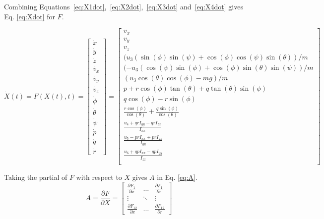 \documentclass[letterpaper, paper,11pt]{AAS}	%
\begin{document}
Combining Equations~\ref{eq:X1dot},~\ref{eq:X2dot},~\ref{eq:X3dot} and~\ref{eq:X4dot} gives Eq. \eqref{eq:Xdot} for $F$.


\begin{equation}
\label{eq:Xdot}
\dot{X}(t) = F(X(t), t) = \begin{bmatrix}
\dot{x} \\ \dot{y} \\ \dot{z} \\ \dot{v_x} \\ \dot{v_y} \\ \dot{v_z} \\ \dot{\phi} \\ \dot{\theta} \\ \dot{\psi} \\ \dot{p} \\ \dot{q} \\ \dot{r} 
\end{bmatrix} =  \begin{bmatrix}
v_x \\
v_y \\
v_z \\
(u_3(\sin(\phi)\sin(\psi) + \cos(\phi)\cos(\psi)\sin(\theta))/m \\
(-u_3(\cos(\psi)\sin(\phi) + \cos(\phi)\sin(\theta)\sin(\psi))/m \\
(u_3\cos(\theta)\cos(\phi) - mg)/m \\
p + r\cos(\phi)\tan(\theta) + q\tan(\theta)\sin(\phi) \\
q\cos(\phi) - r\sin(\phi) \\
\frac{r\cos(\phi)}{\cos(\theta)} + \frac{q\sin(\phi)}{\cos(\theta)} \\
\frac{u_4 + qrI_{yy} - qrI_{zz}}{I_{xx}} \\
\frac{u_5 - prI_{xx} + prI_{zz}}{I_{yy}} \\
\frac{u_6 + qpI_{xx} - qpI_{yy}}{I_{zz}} \\
\end{bmatrix}
\end{equation}

Taking the partial of $F$ with respect to $X$ gives $A$ in Eq. \eqref{eq:A}.
\begin{equation}
\label{eq:A}
A = \frac{\partial F}{\partial X} = 
\begin{bmatrix} 
    \frac{\partial F_1}{\partial x} & \dots  & \frac{\partial F_1}{\partial r}\\
    \vdots & \ddots & \vdots\\
    \frac{\partial F_{12}}{\partial x} & \dots  & \frac{\partial F_{12}}{\partial r} 
\end{bmatrix}
\end{equation}
\end{document}
